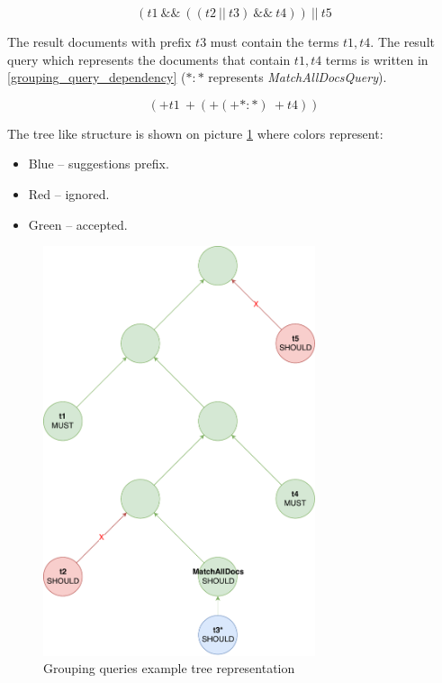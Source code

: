 \begin{equation}
\label{grouping_query_example}
(t1\ \&\&\ ((t2\ \vert\vert\ t3)\ \&\&\ t4))\ \vert\vert\ t5
\end{equation}

The result documents with prefix $t3$ must contain the terms $t1, t4$. The result query which represents the documents that
contain $t1, t4$ terms
is written in \ref{grouping_query_dependency} (${*}\colon{*}$ represents \textit{MatchAllDocsQuery}).

\begin{equation}
\label{grouping_query_dependency}
({+}t1\ {+}({+}({+}{*}\colon{*})\ {+}t4))
\end{equation}

The tree like structure is shown on picture \ref{group_tree} where colors represent:
\begin{itemize}
    \item Blue – suggestions prefix.
    \item Red – ignored.
    \item Green – accepted.
\end{itemize}

\begin{figure}[htbp]
    \centering
    \includegraphics[width=80mm]{../img/complex_query.pdf}
    \caption{Grouping queries example tree representation}
    \label{group_tree}
\end{figure}

